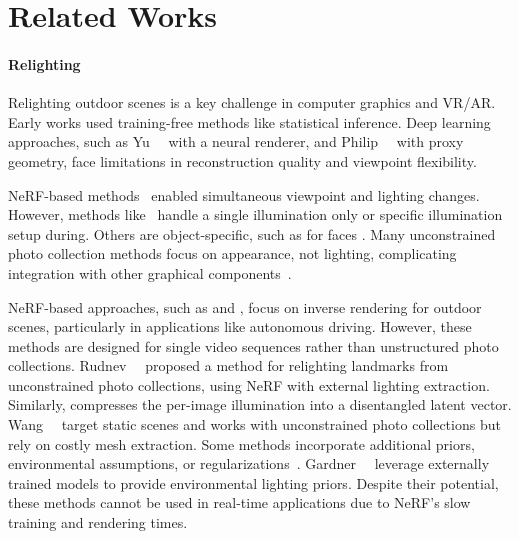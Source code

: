 
\section{Related Works}
  \label{sec:lumigauss-related_works}

  \paragraph{Relighting}
    Relighting outdoor scenes is a key challenge in computer graphics and
    VR/AR.
    Early works \cite{lalonde2009webcam, troccoli2005relighting,
    haber2009relighting, xing2013lighting, sunkavalli2007factored,
    duchene2015multi, barron2014shape} used training-free methods like
    statistical inference.
    Deep learning approaches, such as Yu~\etal~\cite{yu2020self} with a neural
    renderer, and Philip~\etal~\cite{philip2019multi} with proxy geometry,
    face limitations in reconstruction quality and viewpoint flexibility.

    NeRF-based methods~\cite{mildenhall2020nerf} enabled simultaneous
    viewpoint and lighting changes.
    However, methods like~\cite{zhang2021nerfactor, zeng2023nrhints,
    srinivasan2021nerv} handle a single illumination only or specific
    illumination setup during.
    Others are object-specific, such as for faces \cite{sun2021nelf}.
    Many unconstrained photo collection methods focus on appearance, not
    lighting, complicating integration with other graphical
    components~\cite{martin2021nerfw, chen2022hallucinated, yang2023crnerf,
    li2023msnerf}.

    NeRF-based approaches, such as \cite{pun2023lightsim} and \cite{urbanir},
    focus on inverse rendering for outdoor scenes, particularly in
    applications like autonomous driving.
    However, these methods are designed for single video sequences rather than
    unstructured photo collections.
    Rudnev~\etal~\cite{rudnev2022nerfosr} proposed a method for relighting
    landmarks from unconstrained photo collections, using NeRF with external
    lighting extraction.
    Similarly, \cite{li2022neulighting} compresses the per-image illumination
    into a disentangled latent vector.
    Wang~\etal~\cite{wang2023fegr} target static scenes and works with
    unconstrained photo collections but rely on costly mesh extraction.
    Some methods incorporate additional priors, environmental assumptions, or
    regularizations~\cite{solnerf, yang2023complementary}.
    Gardner~\etal~\cite{gardner2023neusky} leverage externally trained models
    to provide environmental lighting priors.
    Despite their potential, these methods cannot be used in real-time
    applications due to NeRF’s slow training and rendering times.

